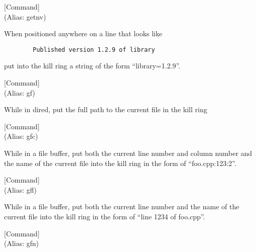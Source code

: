 \vspace{1em}
\noindent
{}
\usebox{\funcname}
 \hfill [Command]\\%
 (Alias: getnv)

\begin{doc-string}
When positioned anywhere on a line that looks like

\small{\begin{verbatim}
        Published version 1.2.9 of library
\end{verbatim}}

put into the kill ring  a string of the form ``library=1.2.9''.
\end{doc-string}

\vspace{1em}
\noindent
{}
\usebox{\funcname}
 \hfill [Command]\\%
 (Alias: gf)

\begin{doc-string}
While in dired, put the full path to the current file in the kill ring
\end{doc-string}

\vspace{1em}
\noindent
{}
\usebox{\funcname}
 \hfill [Command]\\%
 (Alias: gfc)

\begin{doc-string}
While in a file buffer, put both the current line number and
column number and the name of the current file into the kill ring
in the form of ``foo.cpp:123:2''.
\end{doc-string}

\vspace{1em}
\noindent
{}
\usebox{\funcname}
 \hfill [Command]\\%
 (Alias: gfl)

\begin{doc-string}
While in a file buffer, put both the current line number and the name of the current
file into the kill ring in the form of ``line 1234 of foo.cpp''.
\end{doc-string}

\vspace{1em}
\noindent
{}
\usebox{\funcname}
 \hfill [Command]\\%
 (Alias: gfn)

